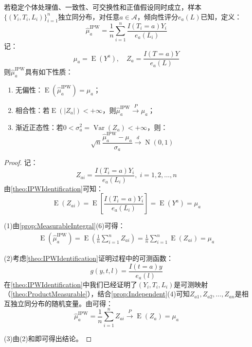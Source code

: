 \begin{property}\label{prop:IPWKnownPropensity}
	若稳定个体处理值、一致性、可交换性和正值假设同时成立，样本$\{(Y_i,T_i,L_i)\}_{i=1}^n$独立同分布，对任意$a\in\mathcal{A}$，倾向性评分$e_a(L)$已知，定义：
	\begin{equation*}
		\hat{\mu}_a^{\text{IPW}}=\frac{1}{n}\sum_{i=1}^n\frac{I(T_i=a)Y_i}{e_a(L_i)}
	\end{equation*}
	记：
	\begin{equation*}
		\mu_a=\operatorname{E}(Y^a),\quad Z_a=\frac{I(T=a)Y}{e_a(L)}
	\end{equation*}
	则$\hat{\mu}_a^{\text{IPW}}$具有如下性质：
	\begin{enumerate}
		\item 无偏性：$\operatorname{E}\left(\hat{\mu}_a^{\text{IPW}}\right)=\mu_a$；
		\item 相合性：若$\operatorname{E}(|Z_a|)<+\infty$，则$\hat{\mu}_a^{\text{IPW}}\overset{P}{\longrightarrow}\mu_a$；
		\item 渐近正态性：若$0<\sigma_a^2=\operatorname{Var}(Z_a)<+\infty$，则：
		\begin{equation*}
			\sqrt{n}\frac{\hat{\mu}_a^{\text{IPW}}-\mu_a}{\sigma_a}\overset{d}{\longrightarrow}\operatorname{N}(0,1)
		\end{equation*}
	\end{enumerate}
\end{property}
\begin{proof}
	记：
	\begin{equation*}
		Z_{ai}=\frac{I(T_i=a)Y_i}{e_a(L_i)},\;i=1,2,\dots,n
	\end{equation*}
	由\cref{theo:IPWIdentification}可知：
	\begin{equation*}
		\operatorname{E}(Z_{ai})=\operatorname{E}\left[\frac{I(T_i=a)Y_i}{e_a(L_i)}\right]=\operatorname{E}(Y^a)=\mu_a
	\end{equation*}\par
	(1)由\cref{prop:MeasurableIntegral}(6)可得：
	\begin{align*}
		\operatorname{E}\left(\hat{\mu}_a^{\text{IPW}}\right)=\operatorname{E}\left(\frac{1}{n}\sum_{i=1}^nZ_{ai}\right)=\frac{1}{n}\sum_{i=1}^n\operatorname{E}(Z_{ai})=\mu_a
	\end{align*}\par
	(2)考虑\cref{theo:IPWIdentification}证明过程中的可测函数：
	\begin{equation*}
		g(y,t,l)=\frac{I(t=a)y}{e_a(l)}
	\end{equation*}
	在\cref{theo:IPWIdentification}中我们已经证明了$(Y_i,T_i,L_i)$是可测映射（\cref{theo:ProductMeasurable}），结合\cref{prop:Independent}(4)可知$Z_{a1},Z_{a2},\dots,Z_{an}$是相互独立同分布的随机变量。由可得：
	\begin{equation*}
		\hat{\mu}_a^{\text{IPW}}=\frac{1}{n}\sum_{i=1}^nZ_{ai}\overset{P}{\longrightarrow}\operatorname{E}(Z_a)=\mu_a
	\end{equation*}\par
	(3)由(2)和即可得出结论。
\end{proof}
